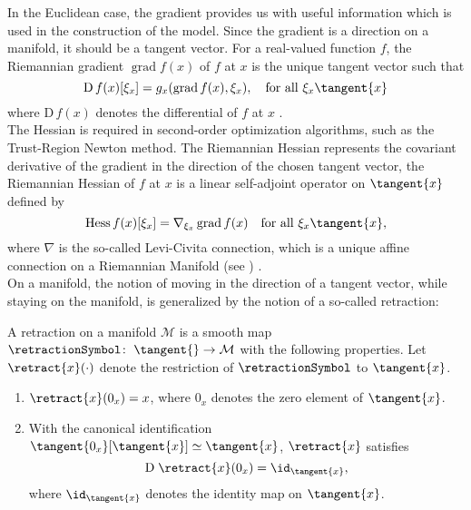 In the Euclidean case, the gradient provides us with useful information which is used in the construction of the model. Since the gradient is a direction on a manifold, it should be a tangent vector. For a real-valued function $f$, the Riemannian gradient $\operatorname{grad} f(x)$ of $f$ at $x$ is the unique tangent vector such that
\begin{equation*}
    \mathrm{D} \, f(x) [\xi_x] = g_x (\operatorname{grad} f(x), \xi_x), \quad \text{for all } \xi_x \tangent{x}
\end{equation*}
where $\mathrm{D} \, f(x)$ denotes the differential of $f$ at $x$ \cite[p.~46]{AbsilMahonySepulchre:2008}. \\
The Hessian is required in second-order optimization algorithms, such as the Trust-Region Newton method. The Riemannian Hessian represents the covariant derivative of the gradient in the direction of the chosen tangent vector, the Riemannian Hessian of $f$ at $x$ is a linear self-adjoint operator on $\tangent{x}$ defined by
\begin{equation*}
    \operatorname{Hess} f(x) [\xi_{x}] = \nabla_{\xi_{x}} \operatorname{grad} f(x) \quad \text{for all } \xi_x \tangent{x},
\end{equation*}
where $\nabla$ is the so-called Levi-Civita connection, which is a unique affine connection on a Riemannian Manifold (see \cite[Theorem~5.3.1~(Levi-Civita)]{AbsilMahonySepulchre:2008}) \cite[p.~105]{AbsilMahonySepulchre:2008}. \\ 


On a manifold, the notion of moving in the direction of a tangent vector, while staying on the manifold, is generalized by the notion of a so-called retraction:

\begin{definition}\label{Retraction}
    A retraction on a manifold $\mathcal{M}$ is a smooth map $\retractionSymbol \colon \; \tangent{} \to \mathcal{M}$ with the following properties. Let $\retract{x}(\cdot)$ denote the restriction of $\retractionSymbol$ to $\tangent{x}$. 
    \begin{enumerate}
        \item $\retract{x}(0_x) = x$, where $0_x$ denotes the zero element of $\tangent{x}$. 
        \item With the canonical identification $\tangent{0_x}[\tangent{x}] \simeq \tangent{x}$, $\retract{x}$ satisfies \begin{equation} \mathrm{D} \; \retract{x}(0_x) = \id_{\tangent{x}}, \label{LocalRigidity} \end{equation} where $\id_{\tangent{x}}$ denotes the identity map on $\tangent{x}$.  
    \end{enumerate}
\end{definition}

